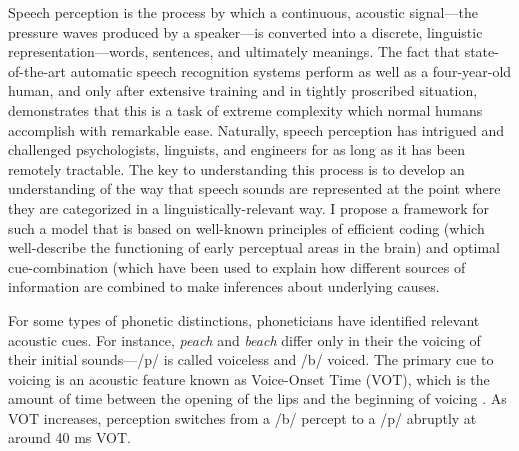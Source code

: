 \documentclass[12pt]{article}
\begin{document}
Speech perception is the process by which a continuous, acoustic signal---the pressure waves produced by a speaker---is converted into a discrete, linguistic representation---words, sentences, and ultimately meanings.  The fact that state-of-the-art automatic speech recognition systems perform as well as a four-year-old human, and only after extensive training and in tightly proscribed situation, demonstrates that this is a task of extreme complexity which normal humans accomplish with remarkable ease.  Naturally, speech perception has intrigued and challenged psychologists, linguists, and engineers for as long as it has been remotely tractable.  The key to understanding this process is to develop an understanding of the way that speech sounds are represented at the point where they are categorized in a linguistically-relevant way.  I propose a framework for such a model that is based on well-known principles of efficient coding (which well-describe the functioning of early perceptual areas in the brain) and optimal cue-combination (which have been used to explain how different sources of information are combined to make inferences about underlying causes.


For some types of phonetic distinctions, phoneticians have identified relevant acoustic cues.  For instance, \emph{peach} and \emph{beach} differ only in their the voicing of their initial sounds---/p/ is called voiceless and /b/ voiced.  The primary cue to voicing is an acoustic feature known as Voice-Onset Time (VOT), which is the amount of time between the opening of the lips 
and the beginning of voicing 
.  As VOT increases, perception switches from a /b/ percept to a /p/ abruptly at around 40 ms VOT.
\end{document}

